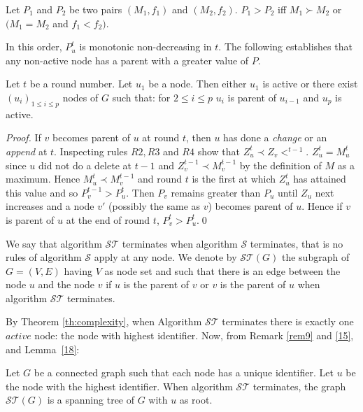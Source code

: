 \documentclass[11pt,envcountsame,letterpaper]{llncs}
\begin{document}
\begin{definition}
Let $P_1$ and $P_2$ be two pairs $(M_1,f_1)$ and $(M_2,f_2)$.
$P_1 > P_2$ iff $M_1 \succ M_2$ or $(M_1=M_2$ and $f_1<f_2)$.
\end{definition}
In this order, $P_u^t$ is monotonic non-decreasing in $t$.
The following establishes that any non-active node has a parent with a greater value of $P$. 
\begin{lemma}\label{18}
Let $t$ be a round number. Let 
$u_1$ be a node. Then either $u_1$ is active or there exist 
$(u_i)_{1\leq i \leq p}$  nodes of $G$
such that: for $2\leq i \leq p$ $u_i$ is parent of $u_{i-1}$ and $u_p$ 
is active.
\end{lemma}
\begin{proof}
  If $v$ becomes parent of $u$ at round $t$,
  then $u$ has done a {\it change} or an {\it append} at $t$.
Inspecting rules $R2, R3$ and $R4$ show that  $Z_u^t \prec Z_v<^{t-1}$.
$Z_u^t = M_u^t$ since $u$ did not do a delete at $t-1$ and $Z_v^{t -1} \prec M_v^{t-1}$ 
by the definition of $M$ as a maximum.
Hence $M_u^t \prec M_v^{t-1}$ and round $t$ is the first at which $Z_u^t$ has attained
this value
and so $P_v^{t-1}>P_u^t$. Then $P_v$ remains greater than $P_u$ until $Z_u$ next
increases and a node $v'$ (possibly the same as $v$) becomes parent of $u$.
Hence if $v$ is parent of $u$ at the end of round $t$, $P_v^t > P_u^t$.\qed
\end{proof}

\begin{definition}
We say that algorithm ${\mathcal {ST}}$ terminates when algorithm ${\mathcal {S}}$ terminates,
that is no rules of algorithm ${\mathcal {S}}$ apply at any node.
We denote by ${\mathcal {ST}}(G)$ 
the subgraph of $G=(V,E)$ having $V$ as node set and such that
there is an edge between the node $u$ and the node $v$ 
if $u$ is the parent of $v$ or $v$ is the parent of $u$ when algorithm
${\mathcal {ST}}$ terminates.
\end{definition}

By Theorem \ref{th:complexity},
when Algorithm  $\mathcal {ST}$ terminates there is exactly one $active$ node:
the node with highest identifier.
Now, from Remark \ref{rem9} and \ref{15}, and Lemma~\ref{18}:
\begin{proposition}\label{21}
Let $G$ be a connected graph such that each node has a unique
identifier. Let $u$ be the node with the highest identifier.
When algorithm $\mathcal {ST}$ terminates,
the graph ${\mathcal {ST}}(G)$ is a spanning tree of $G$ with $u$ as root.
\end{proposition}
\end{document}
